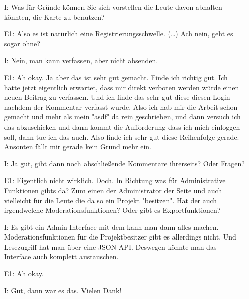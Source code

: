 \begin{itemize}
    \item[I:] Was f{\"u}r Gr{\"u}nde k{\"o}nnen Sie sich vorstellen die Leute davon abhalten k{\"o}nnten, die Karte zu benutzen?
    \item[E1:] Also es ist nat{\"u}rlich eine Registrierungsschwelle. (\dots) Ach nein, geht es sogar ohne?
    \item[I:] Nein, man kann verfassen, aber nicht absenden.
    \item[E1:] Ah okay. Ja aber das ist sehr gut gemacht. Finde ich richtig gut. Ich hatte jetzt eigentlich erwartet, dass mir direkt verboten werden w{\"u}rde einen neuen Beitrag zu verfassen. Und ich finde das sehr gut diese diesen Login nachdem der Kommentar verfasst wurde. Also ich hab mir die Arbeit schon gemacht und mehr als mein "asdf" da rein geschrieben, und dann versuch ich das abzuschicken und dann kommt die Aufforderung dass ich mich einloggen soll, dann tue ich das auch. Also finde ich sehr gut diese Reihenfolge gerade. Ansonten f{\"a}llt mir gerade kein Grund mehr ein. 	 
    \item[I:] Ja gut, gibt dann noch abschlie{\ss}ende Kommentare ihrerseits? Oder Fragen?
    \item[E1:] Eigentlich nicht wirklich. Doch. In Richtung was f{\"u}r Administrative Funktionen gibts da? Zum einen der Administrator der Seite und auch vielleicht f{\"u}r die Leute die da so ein Projekt "besitzen". Hat der auch irgendwelche Moderationsfunktionen? Oder gibt es Exportfunktionen?
    \item[I:] Es gibt ein Admin-Interface mit dem kann man dann alles machen. Moderationsfunktionen f{\"u}r die Projektbesitzer gibt es allerdings nicht. Und Lesezugriff hat man {\"u}ber eine JSON-API. Deswegen k{\"o}nnte man das Interface auch komplett austauschen.
    \item[E1:] Ah okay.
    \item[I:] Gut, dann war es das. Vielen Dank!
\end{itemize}
